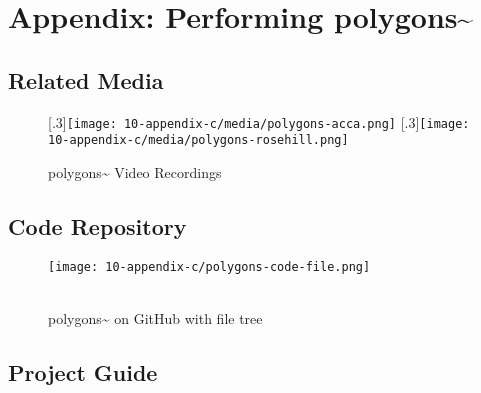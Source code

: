\chapter{Appendix: Performing polygons\textasciitilde{}}

\section{Related Media}
\begin{figure}[!ht]
    \centering
    [.3\linewidth]{\texttt{[image: 10-appendix-c/media/polygons-acca.png]}}
    \hspace*{2cmm}
    [.3\linewidth]{\texttt{[image: 10-appendix-c/media/polygons-rosehill.png]}}
    \caption*{polygons\textasciitilde{} Video Recordings}
\end{figure}
\clearpage


\section{Code Repository}
\begin{figure}[!ht]
    \texttt{[image: 10-appendix-c/polygons-code-file.png]}
    \caption*{ \\ polygons\textasciitilde{} on GitHub with file tree}
\end{figure}
\clearpage







\section{Project Guide}
